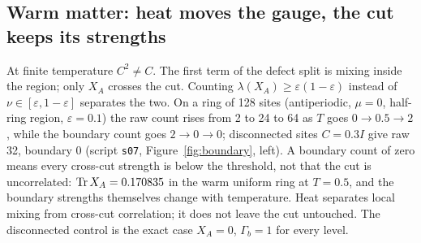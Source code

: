 \subsection{Warm matter: heat moves the gauge, the cut keeps its strengths}
At finite temperature $C^2\neq C$. The first term of the defect split is mixing inside the region; only $X_A$ crosses the cut. Counting $\lambda(X_A)\ge\varepsilon(1-\varepsilon)$ instead of $\nu\in[\varepsilon,1-\varepsilon]$ separates the two. On a ring of 128 sites (antiperiodic, $\mu=0$, half-ring region, $\varepsilon=0.1$) the raw count rises from 2 to 24 to 64 as $T$ goes $0\to0.5\to2$, while the boundary count goes $2\to0\to0$; disconnected sites $C=0.3I$ give raw 32, boundary 0  (script \texttt{s07}, Figure~\ref{fig:boundary}, left). A boundary count of zero means every cross-cut strength is below the threshold, not that the cut is uncorrelated: $\operatorname{Tr} X_A=0.170835$ in the warm uniform ring at $T=0.5$, and the boundary strengths themselves change with temperature. Heat separates local mixing from cross-cut correlation; it does not leave the cut untouched. The disconnected control is the exact case $X_A=0$, $\Gamma_b=1$ for every level.
